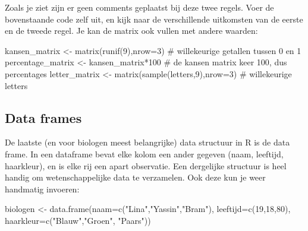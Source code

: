 \documentclass[
  a4paper,
]{scrbook}
\newenvironment{Shaded}{\begin{snugshade}}{\end{snugshade}}
\newcommand{\AttributeTok}[1]{\textcolor[rgb]{0.40,0.45,0.13}{#1}}
\newcommand{\CommentTok}[1]{\textcolor[rgb]{0.37,0.37,0.37}{#1}}
\newcommand{\DecValTok}[1]{\textcolor[rgb]{0.68,0.00,0.00}{#1}}
\newcommand{\FunctionTok}[1]{\textcolor[rgb]{0.28,0.35,0.67}{#1}}
\newcommand{\NormalTok}[1]{\textcolor[rgb]{0.00,0.23,0.31}{#1}}
\newcommand{\OtherTok}[1]{\textcolor[rgb]{0.00,0.23,0.31}{#1}}
\newcommand{\SpecialCharTok}[1]{\textcolor[rgb]{0.37,0.37,0.37}{#1}}
\newcommand{\StringTok}[1]{\textcolor[rgb]{0.13,0.47,0.30}{#1}}
\theoremstyle{definition}
\theoremstyle{remark}
\begin{document}
Zoals je ziet zijn er geen comments geplaatst bij deze twee regels. Voer
de bovenstaande code zelf uit, en kijk naar de verschillende uitkomsten
van de eerste en de tweede regel. Je kan de matrix ook vullen met andere
waarden:

\begin{Shaded}
\begin{Highlighting}[]
\NormalTok{kansen\_matrix }\OtherTok{\textless{}{-}} \FunctionTok{matrix}\NormalTok{(}\FunctionTok{runif}\NormalTok{(}\DecValTok{9}\NormalTok{),}\AttributeTok{nrow=}\DecValTok{3}\NormalTok{) }\CommentTok{\# willekeurige getallen tussen 0 en 1}
\NormalTok{percentage\_matrix }\OtherTok{\textless{}{-}}\NormalTok{ kansen\_matrix}\SpecialCharTok{*}\DecValTok{100}   \CommentTok{\# de kansen matrix keer 100, dus percentages}
\NormalTok{letter\_matrix }\OtherTok{\textless{}{-}} \FunctionTok{matrix}\NormalTok{(}\FunctionTok{sample}\NormalTok{(letters,}\DecValTok{9}\NormalTok{),}\AttributeTok{nrow=}\DecValTok{3}\NormalTok{) }\CommentTok{\# willekeurige letters}
\end{Highlighting}
\end{Shaded}

\subsection{Data frames}\label{data-frames}

De laatste (en voor biologen meest belangrijke) data structuur in R is
de data frame. In een dataframe bevat elke kolom een ander gegeven
(naam, leeftijd, haarkleur), en is elke rij een apart observatie. Een
dergelijke structuur is heel handig om wetenschappelijke data te
verzamelen. Ook deze kun je weer handmatig invoeren:

\begin{Shaded}
\begin{Highlighting}[]
\NormalTok{biologen }\OtherTok{\textless{}{-}} \FunctionTok{data.frame}\NormalTok{(}\AttributeTok{naam=}\FunctionTok{c}\NormalTok{(}\StringTok{"Lina"}\NormalTok{,}\StringTok{"Yassin"}\NormalTok{,}\StringTok{"Bram"}\NormalTok{),}
                       \AttributeTok{leeftijd=}\FunctionTok{c}\NormalTok{(}\DecValTok{19}\NormalTok{,}\DecValTok{18}\NormalTok{,}\DecValTok{80}\NormalTok{), }
                       \AttributeTok{haarkleur=}\FunctionTok{c}\NormalTok{(}\StringTok{"Blauw"}\NormalTok{,}\StringTok{"Groen"}\NormalTok{, }\StringTok{"Paars"}\NormalTok{))}
\end{Highlighting}
\end{Shaded}
\end{document}
